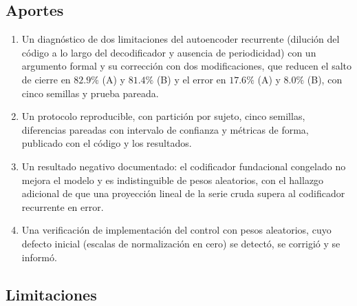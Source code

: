\documentclass[11pt,a4paper]{article}
\begin{document}
\subsection{Aportes}

\begin{enumerate}
\item Un diagnóstico de dos limitaciones del autoencoder recurrente (dilución del código a lo largo del decodificador y ausencia de periodicidad) con un argumento formal y su corrección con dos modificaciones, que reducen el salto de cierre en $82.9\%$ (A) y $81.4\%$ (B) y el error en $17.6\%$ (A) y $8.0\%$ (B), con cinco semillas y prueba pareada.
\item Un protocolo reproducible, con partición por sujeto, cinco semillas, diferencias pareadas con intervalo de confianza y métricas de forma, publicado con el código y los resultados.
\item Un resultado negativo documentado: el codificador fundacional congelado no mejora el modelo y es indistinguible de pesos aleatorios, con el hallazgo adicional de que una proyección lineal de la serie cruda supera al codificador recurrente en error.
\item Una verificación de implementación del control con pesos aleatorios, cuyo defecto inicial (escalas de normalización en cero) se detectó, se corrigió y se informó.
\end{enumerate}

\subsection{Limitaciones}
\end{document}
